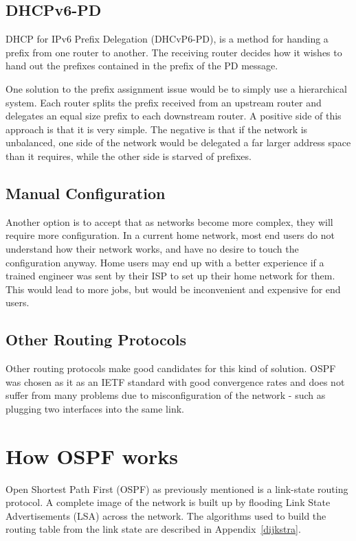 \documentclass[12pt]{report}
\begin{document}
\subsection{DHCPv6-PD}
DHCP for IPv6 Prefix Delegation (DHCvP6-PD), is a method for handing a prefix from one router to
another. The receiving router decides how it wishes to hand out the prefixes
contained in the prefix of the PD message. 

One solution to the prefix assignment issue would be to simply use a
hierarchical system. Each router splits the prefix received from an upstream
router and delegates an equal size prefix to each downstream router. A positive
side of this approach is that it is very simple.  The negative is that if the
network is unbalanced, one side of the network would be delegated a far larger
address space than it requires, while the other side is starved of prefixes.  

\subsection{Manual Configuration}
Another option is to accept that as networks become more complex, they will
require more configuration. In a current home network, most end users do not
understand how their network works, and have no desire to touch the
configuration anyway. Home users may end up with a better experience if a
trained engineer was sent by their ISP to set up their home network for them.
This would lead to more jobs, but would be inconvenient and expensive for end
users.

\subsection{Other Routing Protocols}
Other routing protocols make good candidates for this kind of solution.  OSPF
was chosen as it as an IETF standard with good convergence rates and does not
suffer from many problems due to misconfiguration of the network - such as
plugging two interfaces into the same link.

\section{How OSPF works}
Open Shortest Path First (OSPF) as previously mentioned is a link-state routing
protocol. A complete image of the network is built up by flooding Link State
Advertisements (LSA) across the network. The algorithms used to build the
routing table from the link state are described in Appendix~\ref{dijkstra}.
\end{document}
